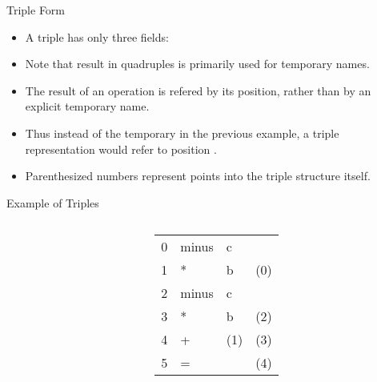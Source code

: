 \begin{bibunit}[apalike]
\tableofcontentslide[sections={1-5},sectionstyle={show/shaded},subsectionstyle={show/shaded/hide},subsubsectionstyle={show/show/hide/hide}]

\begin{frame}{Triple Form}
	\begin{itemize}
	\item A triple has only three fields:
		\begin{center}
		\end{center}
	\vfill
	\item Note that result in quadruples is primarily used for temporary names. 
	\item The result of an operation  is refered by its position, rather than by an explicit temporary name.
	\item Thus instead of the temporary  in the previous example, a triple representation would refer to position .
	\item Parenthesized numbers represent points into the triple structure itself.
	\end{itemize}
\end{frame}

\begin{frame}{Example of Triples}
	\begin{columns}
		\begin{column}{.5\linewidth}
			\begin{tac}[\linewidth]
			\end{tac}
		\end{column}
		\begin{column}{.5\linewidth}
			\begin{tabularx}{\linewidth}{|c|X|X|X|}
			\hline
			\tabularheading&\chead{op}&\chead{arg$_1$}&\chead{arg$_2$}\\
			\hline
			0 & minus & c & \\
			\hline
			1 & * & b & (0) \\
			\hline
			2 & minus & c & \\
			\hline
			3 & * & b & (2) \\
			\hline
			4 & + & (1) & (3) \\
			\hline
			5 & = & \tactext{a} & (4) \\
			\hline
			\end{tabularx}
		\end{column}
	\end{columns}
\end{frame}


\end{bibunit}
